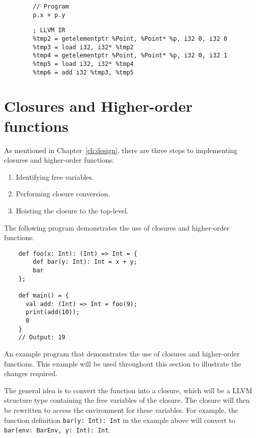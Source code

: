 \begin{tcolorbox}
    \begin{verbatim}
        // Program
        p.x + p.y
    \end{verbatim}
    \tcblower
    \begin{verbatim}
        ; LLVM IR
        %tmp2 = getelementptr %Point, %Point* %p, i32 0, i32 0
        %tmp3 = load i32, i32* %tmp2
        %tmp4 = getelementptr %Point, %Point* %p, i32 0, i32 1
        %tmp5 = load i32, i32* %tmp4
        %tmp6 = add i32 %tmp3, %tmp5
    \end{verbatim}
\end{tcolorbox}

\section{Closures and Higher-order functions}

As mentioned in Chapter~\ref{ch:design}, there are three steps to implementing closures and
higher-order functions:

\begin{enumerate}
    \singlespacing
    \item Identifying free variables.
    \item Performing closure conversion.
    \item Hoisting the closure to the top-level.
\end{enumerate}

The following program demonstrates the use of closures and higher-order functions:

\begin{tcolorbox}
    \begin{verbatim}
    def foo(x: Int): (Int) => Int = {
        def bar(y: Int): Int = x + y;
        bar
    };

    def main() = {
      val add: (Int) => Int = foo(9);
      print(add(10));
      0
    }
    // Output: 19
    \end{verbatim}
    \tcblower
    \footnotesize
    An example program that demonstrates the use of closures and higher-order functions.
    This example will be used throughout this section to illustrate the changes required.
\end{tcolorbox}

The general idea is to convert the function into a closure, which will be a LLVM structure type
containing the free variables of the closure. The closure will then be rewritten to access the
environment for these variables. For example, the function definition
\texttt{bar(y: Int): Int}
in the example above will convert to
\texttt{bar(env: BarEnv, y: Int): Int}.

